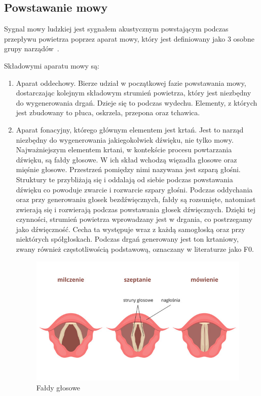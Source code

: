 \documentclass[a4paper,12 pt]{report}
\begin{document}
 
\subsection{Powstawanie mowy}

Sygnal mowy ludzkiej jest sygnałem akustycznym powstającym podczas przepływu powietrza poprzez aparat mowy, który jest definiowany jako 3 osobne grupy narządów~\cite{speech}.

Składowymi aparatu mowy są:
\begin{enumerate}
\item Aparat oddechowy. Bierze udział w początkowej fazie powstawania mowy, dostarczając kolejnym składowym strumień powietrza, który jest niezbędny do wygenerowania drgań. Dzieje się to podczas wydechu. Elementy, z których jest zbudowany to płuca, oskrzela, przepona oraz tchawica.

\item Aparat fonacyjny, którego głównym elementem jest krtań. Jest to narząd niezbędny do wygenerowania jakiegokolwiek dźwięku, nie tylko mowy. Najważniejszym elementem krtani, w kontekście procesu powtarzania dźwięku, są fałdy głosowe. W ich skład wchodzą więzadła głosowe oraz mięśnie głosowe. Przestrzeń pomiędzy nimi nazywana jest szparą głośni. Struktury te przybliżają się i oddalają od siebie podczas powstawania dźwięku co powoduje zwarcie i rozwarcie szpary głośni. Podczas oddychania oraz przy generowaniu głosek bezdźwięcznych, fałdy są rozsunięte, natomiast zwierają się  i rozwierają podczas powstawania głosek dźwięcznych. 
Dzięki tej czynności, strumień powietrza wprowadzany jest w drgania, co postrzegamy jako dźwięczność. Cecha ta występuje wraz z każdą samogłoską oraz przy niektórych spółgłoskach. Podczas drgań generowany jest ton krtaniowy, zwany również częstotliwością podstawową, oznaczany w literaturze jako F0. 
\begin{figure}[!htbp]

\centering
\includegraphics[scale=0.5]{faldy_glosowe}
\caption{Fałdy głosowe ~\cite{krtan}}


\end{figure}
\end{enumerate}
\end{document}
